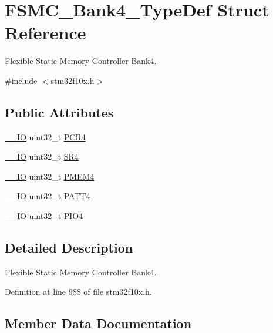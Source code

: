 \hypertarget{struct_f_s_m_c___bank4___type_def}{}\section{F\+S\+M\+C\+\_\+\+Bank4\+\_\+\+Type\+Def Struct Reference}
\label{struct_f_s_m_c___bank4___type_def}


Flexible Static Memory Controller Bank4.  




{\ttfamily \#include $<$stm32f10x.\+h$>$}

\subsection*{Public Attributes}
\begin{DoxyCompactItemize}
\item 
\hyperlink{core__sc300_8h_aec43007d9998a0a0e01faede4133d6be}{\+\_\+\+\_\+\+IO} uint32\+\_\+t \hyperlink{struct_f_s_m_c___bank4___type_def_a0470b5bbb53e9f1bbde09829371eb72f}{P\+C\+R4}
\item 
\hyperlink{core__sc300_8h_aec43007d9998a0a0e01faede4133d6be}{\+\_\+\+\_\+\+IO} uint32\+\_\+t \hyperlink{struct_f_s_m_c___bank4___type_def_a1e0f09be7fa48bb7b14233866da1dd9f}{S\+R4}
\item 
\hyperlink{core__sc300_8h_aec43007d9998a0a0e01faede4133d6be}{\+\_\+\+\_\+\+IO} uint32\+\_\+t \hyperlink{struct_f_s_m_c___bank4___type_def_a4ed4ce751e7a8b3207bd20675b1d9085}{P\+M\+E\+M4}
\item 
\hyperlink{core__sc300_8h_aec43007d9998a0a0e01faede4133d6be}{\+\_\+\+\_\+\+IO} uint32\+\_\+t \hyperlink{struct_f_s_m_c___bank4___type_def_a4cccc7802b573135311cc38e7f247ff5}{P\+A\+T\+T4}
\item 
\hyperlink{core__sc300_8h_aec43007d9998a0a0e01faede4133d6be}{\+\_\+\+\_\+\+IO} uint32\+\_\+t \hyperlink{struct_f_s_m_c___bank4___type_def_a531ebc38c47bebfb198eafb4de24cb2a}{P\+I\+O4}
\end{DoxyCompactItemize}


\subsection{Detailed Description}
Flexible Static Memory Controller Bank4. 

Definition at line 988 of file stm32f10x.\+h.



\subsection{Member Data Documentation}
\mbox{\label{struct_f_s_m_c___bank4___type_def_a4cccc7802b573135311cc38e7f247ff5}} 
